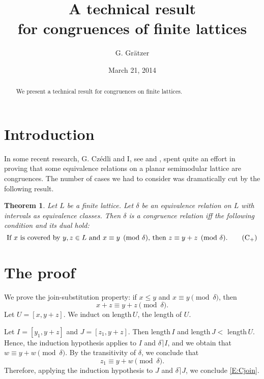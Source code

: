 \documentclass{amsart}
\newtheorem{theorem}{Theorem}
\begin{document}
\title{A technical result\\ for congruences of finite lattices}  
\author{G. Gr\"{a}tzer} 
\address{Department of Mathematics\\
  University of Manitoba\\
  Winnipeg, MB R3T 2N2\\
  Canada}
\date{March 21, 2014}
\begin{abstract}
We present a technical result for congruences on finite lattices.
\end{abstract}
\maketitle

\section{Introduction}\label{S:Introduction}%
In some recent research, G. Cz\'edli
and I, see \cite{gC13} and \cite{gG14}, spent quite an effort
in proving that some equivalence relations 
on a planar semimodular lattice are congruences. 
The number of cases we had to consider
was dramatically cut by the following result.

\begin{theorem}\label{T:technical}%
Let $L$ be a finite lattice. 
Let $\delta$ be an equivalence relation on $L$
with intervals as equivalence classes.
Then $\delta$ is a congruence relation if{}f 
the following condition and its dual hold:
\begin{equation}\label{E:cover}%
\text{If $x$ is covered by $y,z \in L$ 
and $x \equiv y \pmod{\delta}$,
then $z \equiv y + z \pmod{\delta}$.}\tag{C${}_{+}$}
\end{equation}
\end{theorem}

\section{The proof}\label{Proof}%
We prove the join-substitution property:  
if $x \leq y$ and $x \equiv y \pmod{\delta}$, then
\begin{equation}\label{E:Cjoin}%
x + z \equiv y + z \pmod{\delta}.
\end{equation}
Let $U = [x, y+ z]$.
We induct on length\,$U$, the length of $U$.  

Let $I=[y_1,y+ z]$ and $J=[z_1,y+ z]$. 
Then length\,$I$ and length\,$J  < $ length\,$U$. 
Hence, the induction hypothesis applies to $I$ 
and $\delta\rceil I$, and we obtain that 
$w \equiv y+ w \pmod{\delta}$. 
By the transitivity of $\delta$, we conclude that 
\begin{equation}\label{E:three}%
z_1 \equiv y+ w \pmod{\delta}.
\end{equation}
Therefore, applying the induction hypothesis to $J$ 
and $\delta \rceil J$, we conclude \eqref{E:Cjoin}.



\end{document}
